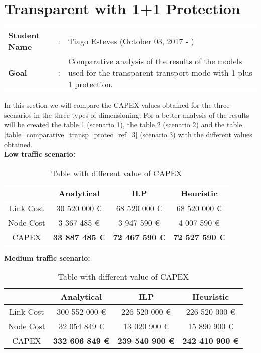 \clearpage

\section{Transparent with 1+1 Protection}\label{comparative_Transp_Protection}
\begin{tcolorbox}	
\begin{tabular}{p{2.75cm} p{0.2cm} p{10.5cm}} 	
\textbf{Student Name}  &:& Tiago Esteves    (October 03, 2017 - )\\
\textbf{Goal}          &:& Comparative analysis of the results of the models used for the transparent transport mode with 1 plus 1 protection.
\end{tabular}
\end{tcolorbox}
\vspace{11pt}


In this section we will compare the CAPEX values obtained for the three scenarios in the three types of dimensioning. For a better analysis of the results will be created the table \ref{table_comparative_transp_protec_ref_1} (scenario 1), the table \ref{table_comparative_transp_protec_ref_2} (scenario 2) and the table \ref{table_comparative_transp_protec_ref_3} (scenario 3) with the different values obtained.\\

\textbf{Low traffic scenario:}

\begin{table}[h!]
\centering
\begin{tabular}{| c | c | c | c |}
 \hline
   & Analytical & ILP & Heuristic \\
 \hline\hline
 Link Cost & 30 520 000 \euro & 68 520 000 \euro & 68 520 000 \euro \\
 Node Cost & 3 367 485 \euro & 3 947 590 \euro & 4 007 590 \euro \\
 CAPEX & \textbf{33 887 485 \euro} & \textbf{72 467 590 \euro} & \textbf{72 527 590 \euro} \\
 \hline
\end{tabular}
\caption{Table with different value of CAPEX }
\label{table_comparative_transp_protec_ref_1}
\end{table}


\vspace{11pt}
\textbf{Medium traffic scenario:}

\begin{table}[h!]
\centering
\begin{tabular}{| c | c | c | c |}
 \hline
   & Analytical & ILP & Heuristic \\
 \hline\hline
 Link Cost & 300 552 000 \euro & 226 520 000 \euro & 226 520 000 \euro \\
 Node Cost & 32 054 849 \euro & 13 020 900 \euro & 15 890 900 \euro \\
 CAPEX & \textbf{332 606 849 \euro} & \textbf{239 540 900 \euro*} & \textbf{242 410 900 \euro} \\
 \hline
\end{tabular}
\caption{Table with different value of CAPEX }
\label{table_comparative_transp_protec_ref_2}
\end{table}


